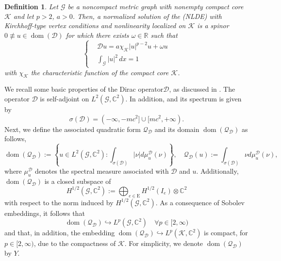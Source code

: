 \documentclass[11pt]{amsart}
\newtheorem{definition}[theorem]{Definition}
\newcommand{\abs}[1]{\lvert#1\rvert}
\newcommand{\D}{\mathcal{D}}
\newcommand{\G}{\mathcal{G}}
\newcommand{\K}{\mathcal{K}}
\numberwithin{equation}{section}
\begin{document}
\begin{definition}
    Let $\G$ be a noncompact metric graph
with nonempty compact core $\K$ and let $p > 2$, $a > 0$. Then, a normalized solution of the (NLDE) with Kirchhoff-type vertex conditions and nonlinearity localized on $\K$ is a spinor $0 \not \equiv u \in \operatorname{dom}(\D )$ for which there exists $\omega \in \mathbb{R}$ such that
\begin{equation}
    \left\{\begin{aligned}
        &\D u = a\chi_\K\abs{u}^{p-2}u + \omega u\\
        &\int_\G\abs{u}^2\,dx = 1
    \end{aligned}
    \right.
\end{equation}
with $\chi_\K$ the characteristic function of the compact core $\K$.
\end{definition}
\fi
We recall some basic properties of the Dirac operator$\D$, as discussed in \cite{Bo}. The operator $\D$  is self-adjoint on $L^2(\mathcal{G}, \mathbb{C}^2)$. In addition, and its spectrum is given by
\begin{equation}
\label{eqsp}
    \sigma{(\D)}=( - \infty , - mc^2
] \cup [mc^2, +\infty ).
\end{equation}
Next, we define the associated quadratic form $\mathcal{Q}_{\mathcal{D}}$ and its domain $\operatorname{dom}(\mathcal{Q}_{\mathcal{D}})$ as follows,
$$
\operatorname{dom}(\mathcal{Q}_{\mathcal{D}}):=\left\{u \in L^2(\mathcal{G}, \mathbb{C}^2): \int_{\sigma(\mathcal{D})}|\nu| d \mu_u^{\mathcal{D}}(\nu)\right\}, \quad \mathcal{Q}_{\mathcal{D}}(u):=\int_{\sigma(\mathcal{D})} \nu d \mu_u^{\mathcal{D}}(\nu),
$$
where $\mu_u^{\mathcal{D}}$ denotes the spectral measure associated with $\mathcal{D}$ and $u$. Additionally, $\operatorname{dom}(\mathcal{Q}_{\mathcal{D}})$ is a closed subspace of
$$
H^{1 / 2}(\mathcal{G}, \mathbb{C}^2):=\bigoplus_{e \in \mathrm{E}} H^{1 / 2}(I_e) \otimes \mathbb{C}^2
$$
with respect to the norm induced by $H^{1 / 2}(\mathcal{G}, \mathbb{C}^2)$. As a consequence of Sobolev embeddings, it follows that
\begin{equation*}
    \operatorname{dom}(\mathcal{Q}_{\mathcal{D}}) \hookrightarrow L^p(\G,\mathbb{C}^2) \quad \forall p \in [2, \infty )
\end{equation*}
and that, in addition, the embedding $\operatorname{dom}(\mathcal{Q}_{\mathcal{D}}) \hookrightarrow L^p(\K,\mathbb{C}^2)$ is compact, for $p \in [2, \infty )$, due to the compactness
of $\K$. For simplicity, we denote $\operatorname{dom}(\mathcal{Q}_{\mathcal{D}})$ by $Y$.
\end{document}
